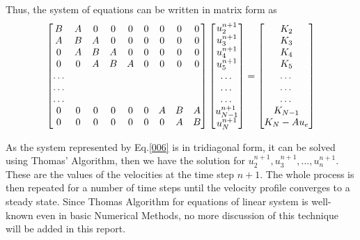 Thus, the system of equations can be written in matrix form as
\begin{equation}
\begin{bmatrix}
            B & A & 0 & 0 & 0 & 0 & 0 & 0 & 0 \\
            A & B & A & 0 & 0 & 0 & 0 & 0 & 0 \\
            0 & A & B & A & 0 & 0 & 0 & 0 & 0 \\
            0 & 0 & A & B & A & 0 & 0 & 0 & 0 \\
            \dots \\
            \dots \\
            \dots \\
            0 & 0 & 0 & 0 & 0 & 0 & A & B & A \\
            0 & 0 & 0 & 0 & 0 & 0 & 0 & A & B
\end{bmatrix}
\begin{bmatrix}
u^{n+1}_2 \\
u^{n+1}_3 \\
u^{n+1}_4 \\
u^{n+1}_5 \\
$\dots$ \\
$\dots$ \\
$\dots$ \\
u^{n+1}_{N-1} \\
u^{n+1}_N \\
\end{bmatrix}
=
\begin{bmatrix}
K_2 \\
K_3 \\
K_4 \\
K_5 \\
$\dots$ \\
$\dots$ \\
$\dots$ \\
K_{N-1} \\
K_N - Au_e \\
\end{bmatrix}
 \label{006}
\end{equation}

As the system represented by Eq.\eqref{006} is in tridiagonal form, it can be solved using Thomas' Algorithm, then we have the solution for $u^{n+1}_2, u^{n+1}_3,...,u^{n+1}_n$. These are the values of the velocities at the time step $n+1$. The whole process is then repeated for a number of time steps until the velocity profile converges to a steady state. Since Thomas Algorithm for equations of linear system is well-known even in basic Numerical Methods, no more discussion of this technique will be added in this report.

